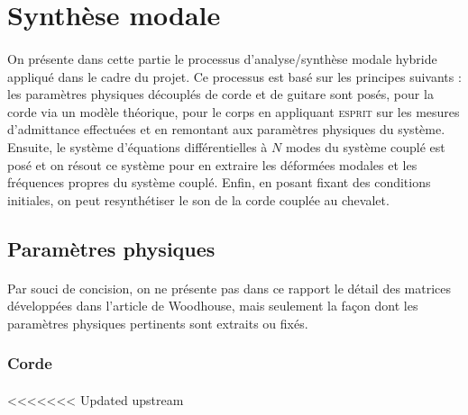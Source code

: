%
%
%
%


\section{Synthèse modale}

\paragraph{}
  On présente dans cette partie le processus d'analyse/synthèse modale hybride
appliqué dans le cadre du projet. Ce processus est basé sur les principes
suivants : les paramètres physiques découplés de corde et de guitare sont
posés, pour la corde via un modèle théorique, pour le corps en appliquant
\textsc{esprit} sur les mesures d'admittance effectuées et en remontant aux
paramètres physiques du système.
  Ensuite, le système d'équations différentielles à \( N \) modes du système
couplé est posé et on résout ce système pour en extraire les déformées modales
et les fréquences propres du système couplé. Enfin, en posant fixant des
conditions initiales, on peut resynthétiser le son de la corde couplée au
chevalet.

\subsection{Paramètres physiques}

\paragraph{}
Par souci de concision, on ne présente pas dans ce rapport le détail des
matrices développées dans l'article de Woodhouse, mais seulement la façon dont
les paramètres physiques pertinents sont extraits ou fixés.

\subsubsection{Corde}
  \paragraph{}
<<<<<<< Updated upstream
  
